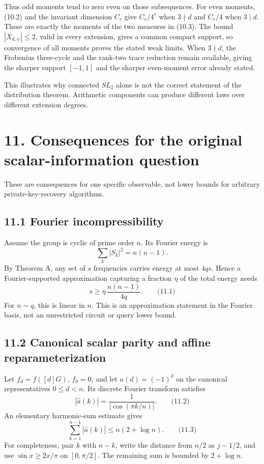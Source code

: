 \documentclass[
  11pt,
  a4paper,
]{article}
\begin{document}
Thus odd moments tend to zero even on those subsequences. For even
moments, (10.2) and the invariant dimension \(C_r\) give \(C_r/4^r\)
when \(3\nmid d\) and \(C_r/4\) when \(3\mid d\). These are exactly the
moments of the two measures in (10.3). The bound \(|X_{d,\psi}|\leq2\),
valid in every extension, gives a common compact support, so convergence
of all moments proves the stated weak limits. When \(3\nmid d\), the
Frobenius three-cycle and the rank-two trace reduction remain available,
giving the sharper support \([-1,1]\) and the sharper even-moment error
already stated.

This illustrates why connected \(SL_2\) alone is not the correct
statement of the distribution theorem. Arithmetic components can produce
different laws over different extension degrees.

\section{11. Consequences for the original scalar-information
question}\label{consequences-for-the-original-scalar-information-question}

These are consequences for one specific observable, not lower bounds for
arbitrary private-key-recovery algorithms.

\subsection{11.1 Fourier
incompressibility}\label{fourier-incompressibility}

Assume the group is cyclic of prime order \(n\). Its Fourier energy is
\[
\sum_k|S_k|^2=n(n-1).
\] By Theorem A, any set of \(s\) frequencies carries energy at most
\(4qs\). Hence a Fourier-supported approximation capturing a fraction
\(\eta\) of the total energy needs \[
\boxed{s\ge\eta\,\frac{n(n-1)}{4q}.}
\qquad \text{(11.1)}
\] For \(n\sim q\), this is linear in \(n\). This is an approximation
statement in the Fourier basis, not an unrestricted circuit or query
lower bound.

\subsection{11.2 Canonical scalar parity and affine
reparameterization}\label{canonical-scalar-parity-and-affine-reparameterization}

Let \(f_d=f([d]G)\), \(f_0=0\), and let \(a(d)=(-1)^d\) on the canonical
representatives \(0\le d<n\). Its discrete Fourier transform satisfies
\[
|\widehat a(k)|=\frac1{|\cos(\pi k/n)|}.
\qquad \text{(11.2)}
\] An elementary harmonic-sum estimate gives \[
\sum_{k=1}^{n-1}|\widehat a(k)|\le n(2+\log n).
\qquad \text{(11.3)}
\] For completeness, pair \(k\) with \(n-k\), write the distance from
\(n/2\) as \(j-1/2\), and use \(\sin x\ge2x/\pi\) on \([0,\pi/2]\). The
remaining sum is bounded by \(2+\log n\).
\end{document}
